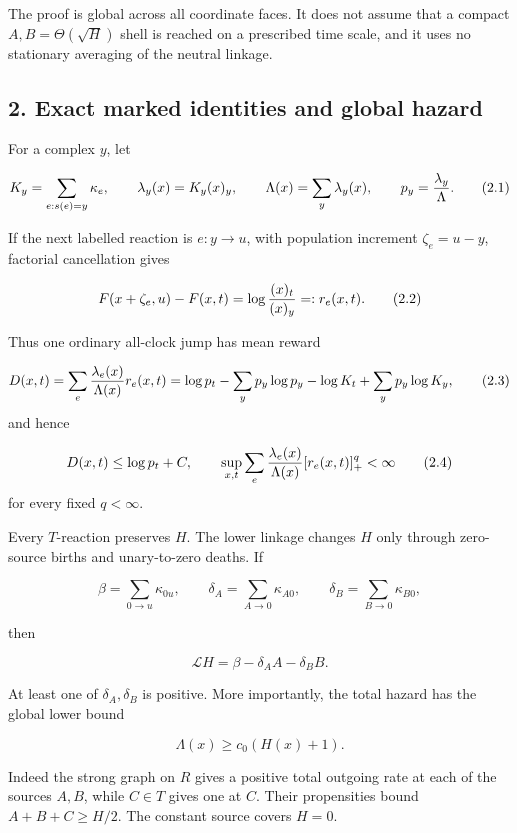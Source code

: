 The proof is global across all coordinate faces. It does not assume that
a compact \(A,B=\Theta(\sqrt H)\) shell is reached on a prescribed time
scale, and it uses no stationary averaging of the neutral linkage.

\subsection{2. Exact marked identities and global
hazard}

For a complex \(y\), let

\[
 K_y=\sum_{e:s(e)=y}\kappa_e,
 \qquad \lambda_y(x)=K_y(x)_y,
 \qquad \Lambda(x)=\sum_y\lambda_y(x),
 \qquad p_y={\lambda_y\over\Lambda}.                  \tag{2.1}
\]

If the next labelled reaction is \(e:y\to u\), with population increment
\(\zeta_e=u-y\), factorial cancellation gives

\[
 F(x+\zeta_e,u)-F(x,t)=\log{(x)_t\over(x)_y}=:r_e(x,t).
                                                               \tag{2.2}
\]

Thus one ordinary all-clock jump has mean reward

\[
 D(x,t)=\sum_e {\lambda_e(x)\over\Lambda(x)}r_e(x,t)
       =\log p_t-\sum_y p_y\log p_y-\log K_t+\sum_y p_y\log K_y,
                                                               \tag{2.3}
\] and hence

\[
 D(x,t)\le\log p_t+C,
 \qquad
 \sup_{x,t}\sum_e {\lambda_e(x)\over\Lambda(x)}[r_e(x,t)]_+^q<\infty
                                                               \tag{2.4}
\] for every fixed \(q<\infty\).

Every \(T\)-reaction preserves \(H\). The lower linkage changes \(H\)
only through zero-source births and unary-to-zero deaths. If

\[
 \beta=\sum_{0\to u}\kappa_{0u},\qquad
 \delta_A=\sum_{A\to0}\kappa_{A0},\qquad
 \delta_B=\sum_{B\to0}\kappa_{B0},                    \tag{2.5}
\]

then

\[
                       \mathcal LH=\beta-\delta_AA-\delta_BB. \tag{2.6}
\]

At least one of \(\delta_A,\delta_B\) is positive. More importantly, the
total hazard has the global lower bound

\[
                            \Lambda(x)\ge c_0(H(x)+1). \tag{2.7}
\]

Indeed the strong graph on \(R\) gives a positive total outgoing rate at
each of the sources \(A,B\), while \(C\in T\) gives one at \(C\). Their
propensities bound \(A+B+C\ge H/2\). The constant source covers \(H=0\).

